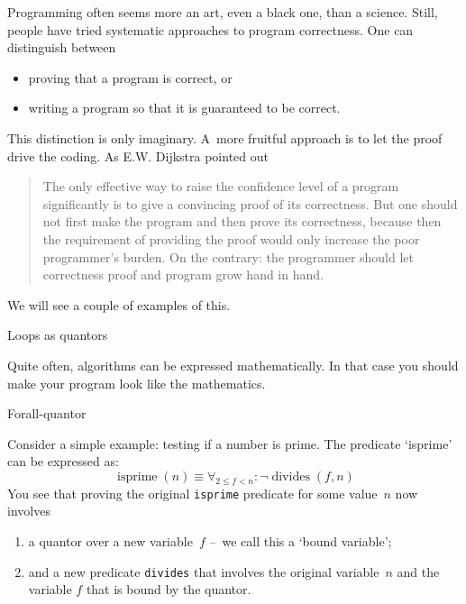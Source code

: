 
Programming often seems more an art, even a black one,
than a science. Still, people have tried
systematic approaches to program correctness.
One can distinguish between
\begin{itemize}
\item proving that a program is correct, or
\item writing a program so that it is guaranteed to be correct.
\end{itemize}
This distinction is only imaginary. A~more fruitful approach
is to let the proof drive the coding.
As E.W. Dijkstra pointed out
\begin{quotation}
  The only effective way to raise the confidence level of a program
  significantly is to give a convincing proof of its correctness. But
  one should not first make the program and then prove its correctness,
  because then the requirement of providing the proof would only
  increase the poor programmer’s burden. On the contrary: the programmer
  should let correctness proof and program grow hand in hand.
\end{quotation}

We will see a couple of examples of this.

 {Loops as quantors}

Quite often, algorithms can be expressed mathematically.
In that case you should make your program look like the mathematics.

 {Forall-quantor}

Consider a simple example: testing if a number is prime.
The predicate `isprime' can be expressed as:
\[
\mathop{\mathrm{isprime}}(n) \equiv
\forall_{2\leq f<n}\colon \neg\mathop{\mathrm{divides}}(f,n)
\]
You see that proving the original \lstinline{isprime} predicate
for some value~$n$ now involves 
\begin{enumerate}
\item a quantor over a new variable~$f$ --~we call this a `bound variable';
\item and a new predicate \lstinline{divides} that involves the original
  variable~$n$ and the variable $f$ that is bound by the quantor.
\end{enumerate}

